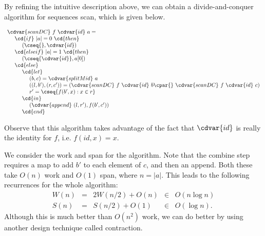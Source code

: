 \begin{cluster}
\label{grp:alg:design::dc::scan-with-divide-and-conquer}

\begin{algorithm}
\label{alg:design::dc::scan-with-divide-and-conquer}
By refining the intuitive description above, we can obtain a
divide-and-conquer algorithm for sequences scan, which is given below.

\[
\begin{array}{l}
\cdvar{scanDC}~f~\cdvar{id}~a =
\\
~~~~\cd{if}~|a| = 0~\cd{then}
\\
~~~~~~~~(\cseq{}, \cdvar{id})
\\
~~~~\cd{else if}~|a| = 1~\cd{then}
\\ 
~~~~~~~~(\cseq{\cdvar{id}},a[0])
\\
~~~~\cd{else}
\\ 
~~~~~~~~\cd{let}
\\ 
~~~~~~~~~~~~(b, c) = \cdvar{splitMid}~a
\\
~~~~~~~~~~~~((l,b'),(r,c')) = (\cdvar{scanDC}~f~\cdvar{id}~b \cpar{}~\cdvar{scanDC}~f~\cdvar{id}~c)
\\
~~~~~~~~~~~~r' = \cseq{f (b',x) : x \in r}
\\
~~~~~~~~\cd{in}
\\
~~~~~~~~~~~~(\cdvar{append}~(l,r'), f(b',c'))
\\
~~~~~~~~\cd{end}
\end{array}
\]

\end{algorithm}
\end{cluster}

\begin{cluster}
\label{grp:rmrk:design::dc::observe}

\begin{remark}
\label{rmrk:design::dc::observe}
Observe that this algorithm takes advantage of the fact that $\cdvar{id}$ is
really the identity for $f$, i.e. $f(id,x) = x$.

\end{remark}
\end{cluster}

\begin{cluster}
\label{grp:grm:design::dc::cost-analysis}

\begin{gram}
\label{grm:design::dc::cost-analysis}
We consider the work and span for the algorithm.  Note that the
combine step requires a map to add $b'$ to each element of $c$, and
then an append.  Both these take $O(n)$ work and $O(1)$ span, where $n
= |a|$.
This leads to the following recurrences for the whole
algorithm:
\[
\begin{array}{lllll}
W(n) & = & 2W(n/2) + O(n) & \in &  O(n \log n)
\\
S(n) & = & S(n/2) + O(1) & \in & O(\log n).
\end{array}
\]
Although this is much better than $O(n^2)$ work, we can do better by
using another design technique called contraction.

\end{gram}
\end{cluster}


